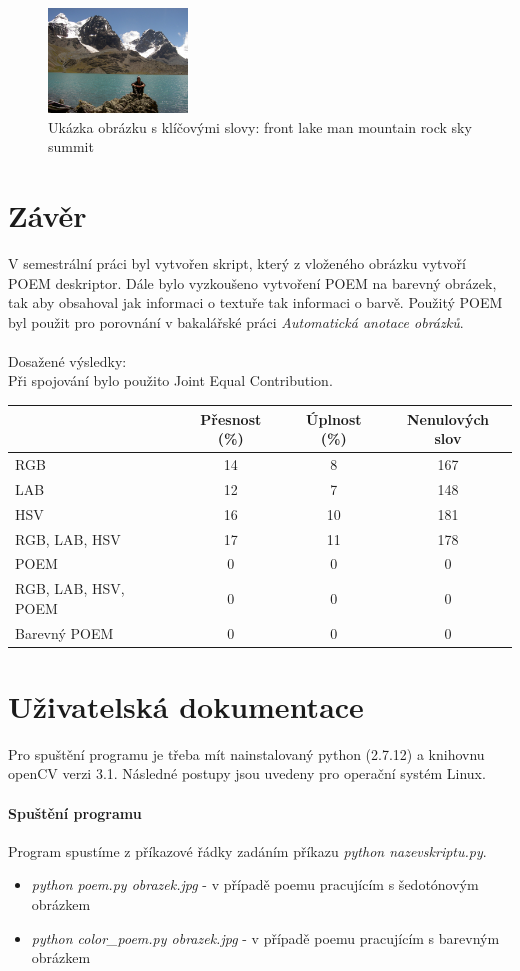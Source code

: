 \documentclass{report}
\begin{document}
\begin{figure}[h]
		\centering
		\includegraphics[width=140px]{./img/iaprtc12.jpg}	
		\caption{Ukázka obrázku s klíčovými slovy: front lake man mountain rock sky summit}
\end{figure}
 
\chapter{Závěr}
V semestrální práci byl vytvořen skript, který z vloženého obrázku vytvoří POEM deskriptor. Dále bylo vyzkoušeno vytvoření POEM na barevný obrázek, tak aby obsahoval jak informaci o textuře tak informaci o barvě. Použitý POEM byl použit pro porovnání v bakalářské práci \textit{Automatická anotace obrázků}. \\
\\
Dosažené výsledky: \\
Při spojování bylo použito Joint Equal Contribution. \cite{JEC} 

\begin{tabular}{l*{3}{c}}
	          		& Přesnost (\%) & Úplnost (\%) & Nenulových slov \\
\hline
RGB						& 14 & 8 & 167 \\
LAB	  			  		& 12 & 7 & 148  \\
HSV            			& 16 & 10 & 181  \\
RGB, LAB, HSV      		& 17 & 11 & 178  \\
POEM		     		& 0 & 0 & 0  \\
RGB, LAB, HSV, POEM		& 0 & 0 & 0  \\
Barevný POEM			& 0 & 0 & 0  \\
\end{tabular}


\chapter{Uživatelská dokumentace}
Pro spuštění programu je třeba mít nainstalovaný python (2.7.12) a knihovnu openCV verzi 3.1. Následné postupy jsou uvedeny pro operační systém Linux.

\subsubsection{Spuštění programu}
Program spustíme z příkazové řádky zadáním příkazu \textit{python nazevskriptu.py}. 
\begin{itemize}
	\item \textit{python poem.py obrazek.jpg} - v případě poemu pracujícím s šedotónovým obrázkem
	\item \textit{python color\_poem.py obrazek.jpg} - v případě poemu pracujícím s barevným obrázkem
\end{itemize}
\end{document}
